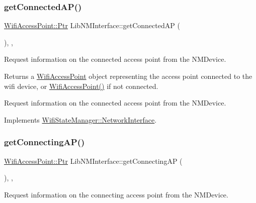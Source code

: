 \subsubsection{\texorpdfstring{get\+Connected\+A\+P()}{getConnectedAP()}}
{\footnotesize\ttfamily \mbox{\hyperlink{classWifiAccessPoint_ad18977f884076774803027efbaa131a0}{Wifi\+Access\+Point\+::\+Ptr}} Lib\+N\+M\+Interface\+::get\+Connected\+AP (\begin{DoxyParamCaption}{ }\end{DoxyParamCaption})\hspace{0.3cm}{\ttfamily [override]}, {\ttfamily [protected]}, {\ttfamily [virtual]}}

Request information on the connected access point from the N\+M\+Device.

\begin{DoxyReturn}{Returns}
a \mbox{\hyperlink{classWifiAccessPoint}{Wifi\+Access\+Point}} object representing the access point connected to the wifi device, or \mbox{\hyperlink{classWifiAccessPoint}{Wifi\+Access\+Point()}} if not connected.
\end{DoxyReturn}
Request information on the connected access point from the N\+M\+Device. 

Implements \mbox{\hyperlink{classWifiStateManager_1_1NetworkInterface_a924f90089b1d0a64771b904bc96ce81a}{Wifi\+State\+Manager\+::\+Network\+Interface}}.

\mbox{\label{classLibNMInterface_a79b0bb8661be490b6cbb68abfdc93152}} 
\subsubsection{\texorpdfstring{get\+Connecting\+A\+P()}{getConnectingAP()}}
{\footnotesize\ttfamily \mbox{\hyperlink{classWifiAccessPoint_ad18977f884076774803027efbaa131a0}{Wifi\+Access\+Point\+::\+Ptr}} Lib\+N\+M\+Interface\+::get\+Connecting\+AP (\begin{DoxyParamCaption}{ }\end{DoxyParamCaption})\hspace{0.3cm}{\ttfamily [override]}, {\ttfamily [protected]}, {\ttfamily [virtual]}}

Request information on the connecting access point from the N\+M\+Device.

